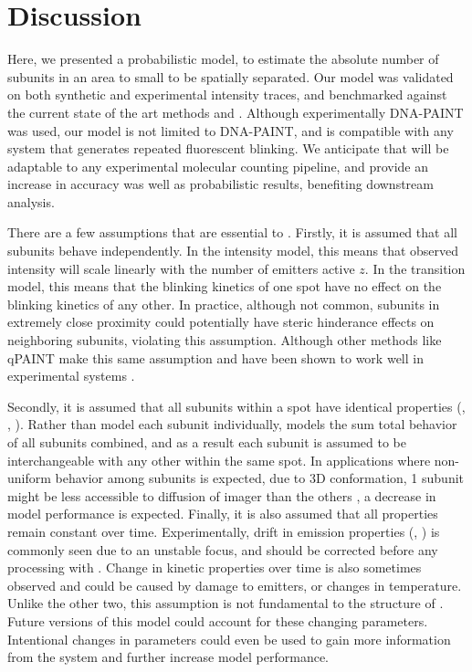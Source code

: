 \section{Discussion}
Here, we presented \ours a probabilistic model, to estimate the absolute 
number of subunits in an area to small to be spatially separated. 
    Our model was validated on both synthetic and experimental intensity traces,
    and benchmarked against the current state of the art methods \lbfcs \cite{stein_2021} and \qpaint \cite{jungmann_2016}.
    Although experimentally DNA-PAINT was used, our model is not 
    limited to DNA-PAINT, and is compatible with any system that generates repeated fluorescent blinking.
    We anticipate that \ours will be adaptable to any experimental molecular counting pipeline,
    and provide an increase in accuracy was well as probabilistic results, benefiting downstream analysis.

There are a few assumptions that are essential to \ours.
    Firstly, it is assumed that all subunits behave independently.
    In the intensity model, this means that observed intensity will scale linearly with the number of emitters active $z$.
    In the transition model, this means that the blinking kinetics of one spot have no effect on the blinking kinetics of any other.
    In practice, although not common, subunits in extremely close proximity could potentially 
    have steric hinderance effects on neighboring subunits, violating this assumption.
    Although other methods like qPAINT make this same assumption and have been shown to work well in experimental 
    systems \cite{fischer_quantitative_2021, jayasinghe_true_2018}. 
    
Secondly, it is assumed that all subunits within a spot have identical properties (\pon, \poff, \re).
    Rather than model each subunit individually, \ours models the sum total behavior of all subunits combined, 
    and as a result each subunit is assumed to be interchangeable with any other within the same spot.
    In applications where non-uniform behavior among subunits is expected, \eg due to 3D conformation, 
    1 subunit might be less accessible to diffusion of imager than the others \cite{civitci_2020}, a decrease in model performance is expected.
    Finally, it is also assumed that all properties remain constant over time. 
    Experimentally, drift in emission properties (\re, \rb) is commonly seen due to an unstable focus, and should be corrected before any processing with \ours.
    Change in kinetic properties over time is also sometimes observed and could be caused by damage to emitters, or changes in temperature. 
    Unlike the other two, this assumption is not fundamental to the structure of \ours. 
    Future versions of this model could account for these changing parameters.
    Intentional changes in parameters could even be used to gain more information from the system and further increase model performance. 
    

